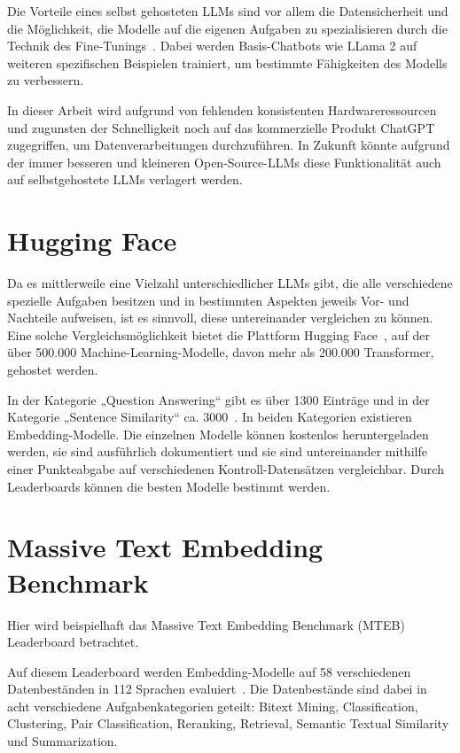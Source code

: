 Die Vorteile eines selbst gehosteten LLMs sind vor allem die Datensicherheit und die Möglichkeit, die Modelle auf die eigenen Aufgaben zu spezialisieren durch die Technik des Fine-Tunings~\cite{ouyang}.
Dabei werden Basis-Chatbots wie LLama 2 auf weiteren spezifischen Beispielen trainiert, um bestimmte Fähigkeiten des Modells zu verbessern.

In dieser Arbeit wird aufgrund von fehlenden konsistenten Hardwareressourcen und zugunsten der Schnelligkeit noch auf das kommerzielle Produkt ChatGPT~\cite{chatgpt} zugegriffen, um Datenverarbeitungen durchzuführen.
In Zukunft könnte aufgrund der immer besseren und kleineren Open-Source-LLMs diese Funktionalität auch auf selbstgehostete LLMs verlagert werden.

\section{Hugging Face}

Da es mittlerweile eine Vielzahl unterschiedlicher LLMs gibt, die alle verschiedene spezielle Aufgaben besitzen und in bestimmten Aspekten jeweils Vor- und Nachteile aufweisen, ist es sinnvoll, diese untereinander vergleichen zu können.
Eine solche Vergleichsmöglichkeit bietet die Plattform Hugging Face~\cite{wolf2020}, auf der über 500.000 Machine-Learning-Modelle, davon mehr als 200.000 Transformer, gehostet werden.

In der Kategorie „Question Answering“ gibt es über 1300 Einträge und in der Kategorie „Sentence Similarity“ ca. 3000~\cite{2024}.
In beiden Kategorien existieren Embedding-Modelle.
Die einzelnen Modelle können kostenlos heruntergeladen werden, sie sind ausführlich dokumentiert und sie sind untereinander mithilfe einer Punkteabgabe auf verschiedenen Kontroll-Datensätzen vergleichbar.
Durch Leaderboards können die besten Modelle bestimmt werden.

\section{Massive Text Embedding Benchmark}

Hier wird beispielhaft das Massive Text Embedding Benchmark (MTEB)~\cite{muennighoff2023} Leaderboard  betrachtet.

Auf diesem Leaderboard werden Embedding-Modelle auf 58 verschiedenen Datenbeständen in 112 Sprachen evaluiert~\cite{muennighoff2023}.
Die Datenbestände sind dabei in acht verschiedene Aufgabenkategorien geteilt:
Bitext Mining, Classification, Clustering, Pair Classification, Reranking, Retrieval, Semantic Textual Similarity und Summarization.

